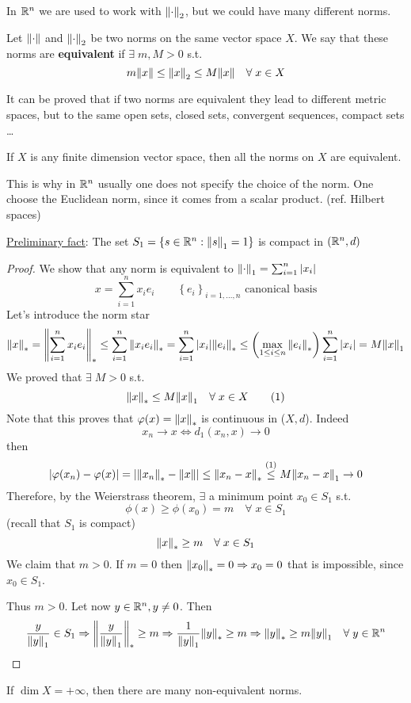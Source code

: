 In \(\mathbb{R}^n\) we are used to work with \(\norm{\cdot}_2\), but we could have many different norms.
\begin{definition}
    Let \(\norm{\cdot}\) and \(\norm{\cdot}_2\) be two norms on the same vector space \(X\). We say that these norms are \textbf{equivalent} if \(\exists \; m, M >0\) s.t. 
    \[
        m\norm{x} \leq \norm{x}_2 \leq M\norm{x} \quad \forall\; x \in X
    \]
\end{definition}
It can be proved that if two norms are equivalent they lead to different metric spaces, but to the same open sets, closed sets, convergent sequences, compact sets \dots
\begin{theorem}
    If \(X\) is any finite dimension vector space, then all the norms on \(X\) are equivalent.
\end{theorem}
\begin{remark}
    This is why in \(\mathbb{R}^n\) usually one does not specify the choice of the norm. One choose the Euclidean norm, since it comes from a scalar product. (ref. Hilbert spaces)
\end{remark}
\noindent\underline{Preliminary fact}: The set \(S_1 = \left\{ s \in \mathbb{R}^n : \norm{s}_1  = 1\right\}\) is compact in \((\mathbb{R}^n, d)\)
\begin{proof}
    We show that any norm is equivalent to \(\norm{\cdot}_1 = \sum_{i=1}^n \abs{x_i}\)
    \[
        x = \sum_{i=1}^n x_i e_i \qquad \left\{ e_i \right\}_{i= 1,\ldots, n} \mbox{ canonical basis}
    \]
    Let's introduce the norm star 
    \[
        \norm{x}_* = \norm{\sum_{i=1}^n x_i e_i}_* 
        \leq \sum_{i=1}^n \norm{x_i e_i}_* = \sum_{i=1}^n \abs{x_i} \norm{e_i}_* 
        \leq \left(\max_{1 \leq i \leq n} \norm{e_i}_*\right) \sum_{i=1}^n \abs{x_i}
        = M \norm{x}_1
    \]
    We proved that \(\exists \; M> 0\) s.t.
    \[
        \norm{x}_* \leq M \norm{x}_1 \quad \forall \; x \in X \tag{1}
    \]
    Note that this proves that \(\varphi(x) = \norm{x}_*\) is continuous in (\(X, d\)). Indeed 
    \[
        x_n \to x \Leftrightarrow d_1(x_n, x) \to 0
    \]
    then 
    \[
        \abs{\varphi(x_n) - \varphi(x)} = \abs{\norm{x_n}_* -\norm{x}} \leq \norm{x_n - x}_* 
        \overset{(1)}{\leq} M\norm{x_n - x}_1 \to 0
    \]
    Therefore, by the Weierstrass theorem, \(\exists\) a minimum point \(x_0 \in S_1\) s.t. 
    \[
        \phi(x) \geq \phi(x_0) = m \quad \forall\; x \in S_1
    \]
    (recall that \(S_1\) is compact)
    \[
        \norm{x}_* \geq m \quad \forall \; x \in S_1
    \]
    We claim that \(m>0\). If \(m=0\) then \(\norm{x_0}_* = 0 \Rightarrow x_0  = 0\) that is impossible, since \(x_0 \in S_1\).

    Thus \(m>0\). Let now \(y \in \mathbb{R}^n, y \neq 0\). Then 
    \[
        \frac{y}{\norm{y}_1} \in S_1 
        \Rightarrow \norm{\frac{y}{\norm{y}_1}}_* \geq m 
        \Rightarrow \frac{1}{\norm{y}_1} \norm{y}_* \geq m 
        \Rightarrow \norm{y}_* \geq m \norm{y}_1 \quad \forall \; y \in \mathbb{R}^n 
    \]
\end{proof}
If \(\dim X = +\infty\), then there are many non-equivalent norms.

